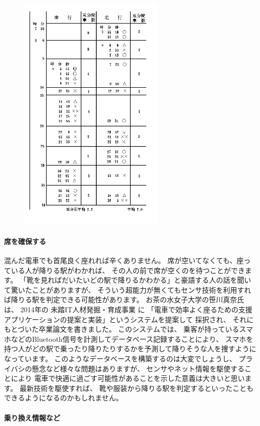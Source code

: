 \documentclass[twocolumn,10pt]{jarticle}
\begin{document}
  \begin{figure}[htbp]
    \includegraphics[clip,width=7.0cm]{./terada.png}
  \end{figure}

\paragraph{席を確保する}
  
  混んだ電車でも首尾良く座れれば辛くありません。 席が空いてなくても、座っている人が降りる駅がわかれば、 その人の前で席が空くのを待つことができます。 「靴を見ればだいたいどの駅で降りるかわかる」と豪語する人の話を聞いて驚いたことがありますが、 そういう超能力が無くてもセンサ技術を利用すれば降りる駅を判定できる可能性があります。
  お茶の水女子大学の笹川真奈氏は、 2014年の 未踏IT人材発掘・育成事業 に 「電車で効率よく座るための支援アプリケーションの提案と実装」というシステムを提案して 採択され、 それにもとづいた卒業論文を書きました。 このシステムでは、 乗客が持っているスマホなどのBluetooth信号を計測してデータベース記録することにより、 スマホを持つ人がどの駅で乗ったり降りたりするかを予測して降りそうな人を捜すようになっています。
  このようなデータベースを構築するのは大変でしょうし、 プライバシの懸念など様々な問題はありますが、 センサやネット情報を駆使することにより 電車で快適に過ごす可能性があることを示した意義は大きいと思います。 最新技術を駆使すれば、 靴や服装から降りる駅を判定するといったこともできるようになるのかもしれません。

\paragraph{乗り換え情報など}
  
\end{document}
